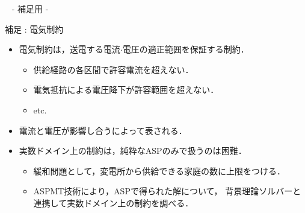 \appendix
\backupbegin

\begin{frame}{~}
 \centering
 - 補足用 -
\end{frame} 

\begin{frame}{補足 : 電気制約}
 \begin{itemize}
  \item \alert{電気制約}は，送電する電流$\cdot$電圧の適正範囲を保証する制約．
  \begin{itemize}
   \item 供給経路の各区間で許容電流を超えない．
   \item 電気抵抗による電圧降下が許容範囲を超えない．
   \item etc.
  \end{itemize}
  \item 電流と電圧が影響し合うによって表される．
  \item 実数ドメイン上の制約は，純粋なASPのみで扱うのは\alert{困難}．
		\begin{itemize}
		 \item 緩和問題として，変電所から供給できる家庭の数に上限をつける．
		 \item ASPMT技術により，ASPで得られた解について，
			   背景理論ソルバーと連携して実数ドメイン上の制約を調べる．
		\end{itemize}
 \end{itemize}
\end{frame}

